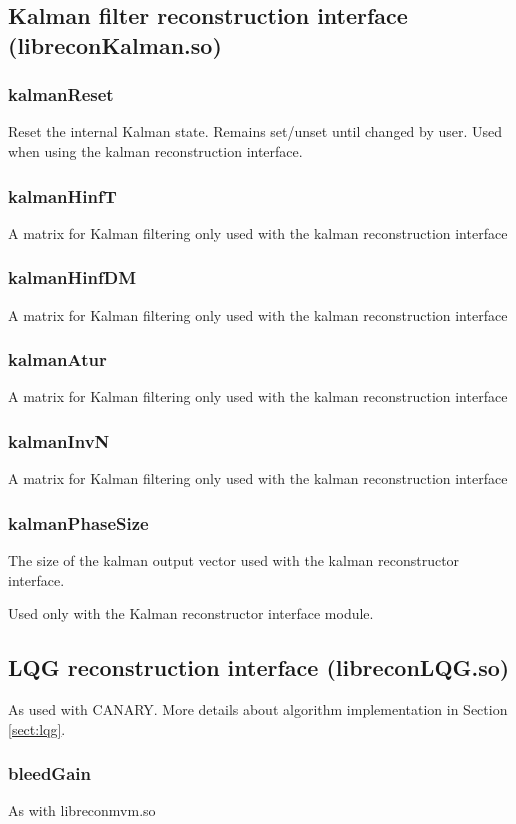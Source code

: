 \documentclass[a4,10pt]{article}
\begin{document}
\subsection{Kalman filter reconstruction interface (libreconKalman.so)}
\subsubsection{kalmanReset}
Reset the internal Kalman state.  Remains set/unset until changed by
user.  Used when using the kalman reconstruction interface.

\subsubsection{kalmanHinfT}
A matrix for Kalman filtering only used with the kalman reconstruction interface

\subsubsection{kalmanHinfDM}
A matrix for Kalman filtering only used with the kalman reconstruction interface

\subsubsection{kalmanAtur}
A matrix for Kalman filtering only used with the kalman reconstruction interface

\subsubsection{kalmanInvN}
A matrix for Kalman filtering only used with the kalman reconstruction interface

\subsubsection{kalmanPhaseSize}
The size of the kalman output vector used with the kalman
reconstructor interface.

Used only with the Kalman reconstructor interface module.

\subsection{LQG reconstruction interface (libreconLQG.so)}
As used with CANARY.  More details about algorithm implementation in
Section \ref{sect:lqg}.

\subsubsection{bleedGain}
As with libreconmvm.so
\end{document}
